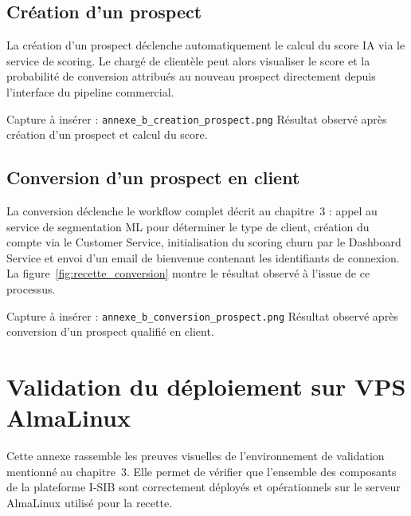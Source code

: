 \documentclass[a4paper,12pt]{report}
\begin{document}
\section{Création d'un prospect}

La création d'un prospect déclenche automatiquement le calcul du score IA via
le service de scoring. Le chargé de clientèle peut alors visualiser le score
et la probabilité de conversion attribués au nouveau prospect directement
depuis l'interface du pipeline commercial.

\begin{emplacementcapture}{Capture à insérer : \texttt{annexe\_b\_creation\_prospect.png}}
Résultat observé après création d'un prospect et calcul du score.
\end{emplacementcapture}
\label{fig:recette_creation}

\section{Conversion d'un prospect en client}

La conversion déclenche le workflow complet décrit au chapitre~3 : appel au
service de segmentation ML pour déterminer le type de client, création du
compte via le Customer Service, initialisation du scoring churn par le
Dashboard Service et envoi d'un email de bienvenue contenant les identifiants
de connexion. La figure~\ref{fig:recette_conversion} montre le résultat
observé à l'issue de ce processus.

\begin{emplacementcapture}{Capture à insérer : \texttt{annexe\_b\_conversion\_prospect.png}}
Résultat observé après conversion d'un prospect qualifié en client.
\end{emplacementcapture}
\label{fig:recette_conversion}

\chapter{Validation du déploiement sur VPS AlmaLinux}
\label{ann:validation-deploiement}

Cette annexe rassemble les preuves visuelles de l'environnement de validation
mentionné au chapitre~3. Elle permet de vérifier que l'ensemble des
composants de la plateforme I-SIB sont correctement déployés et opérationnels
sur le serveur AlmaLinux utilisé pour la recette.
\end{document}
